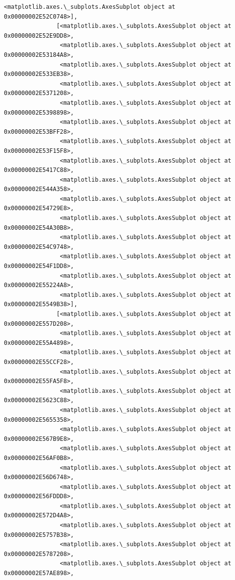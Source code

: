 \documentclass[11pt]{article}
\begin{document}
\begin{Verbatim}[commandchars=\\\{\}]
                <matplotlib.axes.\_subplots.AxesSubplot object at 0x00000002E52C0748>],
               [<matplotlib.axes.\_subplots.AxesSubplot object at 0x00000002E52E9DD8>,
                <matplotlib.axes.\_subplots.AxesSubplot object at 0x00000002E53184A8>,
                <matplotlib.axes.\_subplots.AxesSubplot object at 0x00000002E533EB38>,
                <matplotlib.axes.\_subplots.AxesSubplot object at 0x00000002E5371208>,
                <matplotlib.axes.\_subplots.AxesSubplot object at 0x00000002E5398898>,
                <matplotlib.axes.\_subplots.AxesSubplot object at 0x00000002E53BFF28>,
                <matplotlib.axes.\_subplots.AxesSubplot object at 0x00000002E53F15F8>,
                <matplotlib.axes.\_subplots.AxesSubplot object at 0x00000002E5417C88>,
                <matplotlib.axes.\_subplots.AxesSubplot object at 0x00000002E544A358>,
                <matplotlib.axes.\_subplots.AxesSubplot object at 0x00000002E54729E8>,
                <matplotlib.axes.\_subplots.AxesSubplot object at 0x00000002E54A30B8>,
                <matplotlib.axes.\_subplots.AxesSubplot object at 0x00000002E54C9748>,
                <matplotlib.axes.\_subplots.AxesSubplot object at 0x00000002E54F1DD8>,
                <matplotlib.axes.\_subplots.AxesSubplot object at 0x00000002E55224A8>,
                <matplotlib.axes.\_subplots.AxesSubplot object at 0x00000002E5549B38>],
               [<matplotlib.axes.\_subplots.AxesSubplot object at 0x00000002E557D208>,
                <matplotlib.axes.\_subplots.AxesSubplot object at 0x00000002E55A4898>,
                <matplotlib.axes.\_subplots.AxesSubplot object at 0x00000002E55CCF28>,
                <matplotlib.axes.\_subplots.AxesSubplot object at 0x00000002E55FA5F8>,
                <matplotlib.axes.\_subplots.AxesSubplot object at 0x00000002E5623C88>,
                <matplotlib.axes.\_subplots.AxesSubplot object at 0x00000002E5655358>,
                <matplotlib.axes.\_subplots.AxesSubplot object at 0x00000002E567B9E8>,
                <matplotlib.axes.\_subplots.AxesSubplot object at 0x00000002E56AF0B8>,
                <matplotlib.axes.\_subplots.AxesSubplot object at 0x00000002E56D6748>,
                <matplotlib.axes.\_subplots.AxesSubplot object at 0x00000002E56FDDD8>,
                <matplotlib.axes.\_subplots.AxesSubplot object at 0x00000002E572D4A8>,
                <matplotlib.axes.\_subplots.AxesSubplot object at 0x00000002E5757B38>,
                <matplotlib.axes.\_subplots.AxesSubplot object at 0x00000002E5787208>,
                <matplotlib.axes.\_subplots.AxesSubplot object at 0x00000002E57AE898>,

\end{Verbatim}
\end{document}
